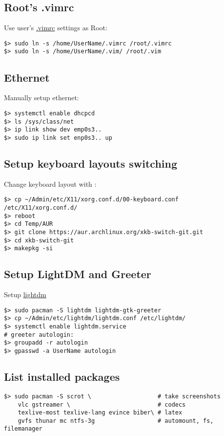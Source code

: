 \documentclass[a4paper, 12pt]{article}
\begin{document}
\subsection{Root's .vimrc}
Use user's \url{.vimrc} settings as Root:
\begin{lstlisting}
$> sudo ln -s /home/UserName/.vimrc /root/.vimrc
$> sudo ln -s /home/UserName/.vim/ /root/.vim
\end{lstlisting}

\subsection{Ethernet}
Manually setup ethernet:
\begin{lstlisting}
$> systemctl enable dhcpcd
$> ls /sys/class/net
$> ip link show dev emp0s3..
$> sudo ip link set enp0s3.. up
\end{lstlisting}

\subsection{Setup keyboard layouts switching}
Change keyboard layout with \keyss{\capslock}:
\begin{lstlisting}
$> cp ~/Admin/etc/X11/xorg.conf.d/00-keyboard.conf /etc/X11/xorg.conf.d/
$> reboot
$> cd Temp/AUR
$> git clone https://aur.archlinux.org/xkb-switch-git.git
$> cd xkb-switch-git
$> makepkg -si
\end{lstlisting}

\subsection{Setup LightDM and Greeter}
Setup \url{lightdm}
\begin{lstlisting}
$> sudo pacman -S lightdm lightdm-gtk-greeter
$> cp ~/Admin/etc/lightdm/lightdm.conf /etc/lightdm/
$> systemctl enable lightdm.service
# greeter autologin:
$> groupadd -r autologin
$> gpasswd -a UserName autologin
\end{lstlisting}

\subsection{List installed packages}
\begin{lstlisting}
$> sudo pacman -S scrot \                   # take screenshots
    vlc gstreamer \                         # codecs
    texlive-most texlive-lang evince biber\ # latex
    gvfs thunar mc ntfs-3g                  # automount, fs, filemanager
\end{lstlisting}
\end{document}
